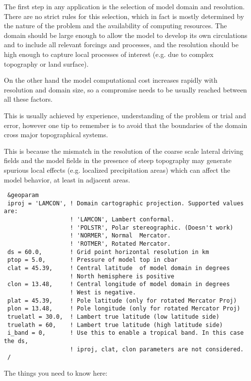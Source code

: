 The first step in any application is the selection of model domain and
resolution. There are no strict rules for this selection, which in fact is
mostly determined by the nature of the problem and the availability of
computing resources. The domain should be large enough to allow the model to
develop its own circulations and to include all relevant forcings and
processes, and the resolution should be high enough to capture local processes
of interest (e.g. due to complex topography or land surface).

On the other hand the model computational cost increases rapidly with
resolution and domain size, so a compromise needs to be usually reached
between all these factors.

This is usually achieved by experience, understanding of the problem or
trial and error, however one tip to remember is to avoid that the boundaries
of the domain cross major topographical systems.

This is because the mismatch in the resolution of the coarse scale lateral
driving fields and the model fields in the presence of steep topography may
generate spurious local effects (e.g. localized precipitation areas) which can
affect the model behavior, at least in adjacent areas. 

{\footnotesize
\begin{Verbatim}
 &geoparam
 iproj = 'LAMCON', ! Domain cartographic projection. Supported values are:
                   ! 'LAMCON', Lambert conformal.
                   ! 'POLSTR', Polar stereographic. (Doesn't work)
                   ! 'NORMER', Normal  Mercator.
                   ! 'ROTMER', Rotated Mercator.
 ds = 60.0,        ! Grid point horizontal resolution in km
 ptop = 5.0,       ! Pressure of model top in cbar
 clat = 45.39,     ! Central latitude  of model domain in degrees
                   ! North hemisphere is positive
 clon = 13.48,     ! Central longitude of model domain in degrees
                   ! West is negative.
 plat = 45.39,     ! Pole latitude (only for rotated Mercator Proj)
 plon = 13.48,     ! Pole longitude (only for rotated Mercator Proj)
 truelatl = 30.0,  ! Lambert true latitude (low latitude side)
 truelath = 60,    ! Lambert true latitude (high latitude side)
 i_band = 0,       ! Use this to enable a tropical band. In this case the ds,
                   ! iproj, clat, clon parameters are not considered.
 /
\end{Verbatim}
}

The things you need to know here:

